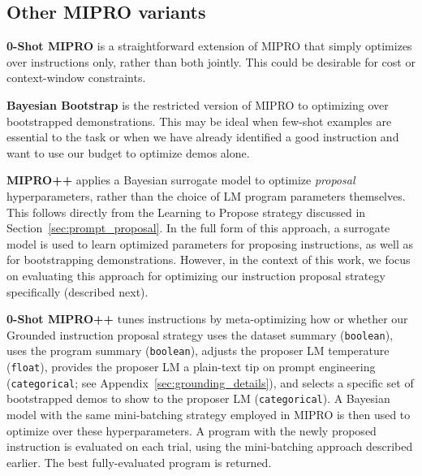 \subsection{Other MIPRO variants}


\hspace*{\parindent}
\textbf{0-Shot MIPRO} is a straightforward extension of MIPRO that simply optimizes over instructions only, rather than both jointly. This could be desirable for cost or context-window constraints.

\textbf{Bayesian Bootstrap} is the restricted version of MIPRO to optimizing over bootstrapped demonstrations. This may be ideal when few-shot examples are essential to the task or when we have already identified a good instruction and want to use our budget to optimize demos alone.

\textbf{MIPRO++} applies a Bayesian surrogate model to optimize \textit{proposal} hyperparameters, rather than the choice of LM program parameters themselves. This follows directly from the Learning to Propose strategy discussed in Section~\ref{sec:prompt_proposal}. In the full form of this approach, a surrogate  model is used to learn optimized parameters for proposing instructions, as well as for bootstrapping demonstrations. However, in the context of this work, we focus on evaluating this approach for optimizing our instruction proposal strategy specifically (described next). 

\textbf{0-Shot MIPRO++} tunes instructions by meta-optimizing how or whether our Grounded instruction proposal strategy uses the dataset summary (\texttt{boolean}), uses the program summary (\texttt{boolean}), adjusts the proposer LM temperature (\texttt{float}), provides the proposer LM a plain-text tip on prompt engineering  (\texttt{categorical}; see Appendix~\ref{sec:grounding_details}), and selects a specific set of bootstrapped demos to show to the proposer LM (\texttt{categorical}). A Bayesian model with the same mini-batching strategy employed in MIPRO is then used to optimize over these hyperparameters. A program with the newly proposed instruction is evaluated on each trial, using the mini-batching approach described earlier. The best fully-evaluated program is returned.


